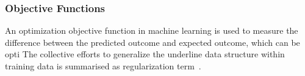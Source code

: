 \subsubsection{Objective Functions}
An optimization objective function in machine learning is used to measure the difference between the predicted outcome and expected outcome, which can be opti The collective efforts to generalize the underline data structure within training data is summarised as regularization term~\cite{goodfellow_2015}.  